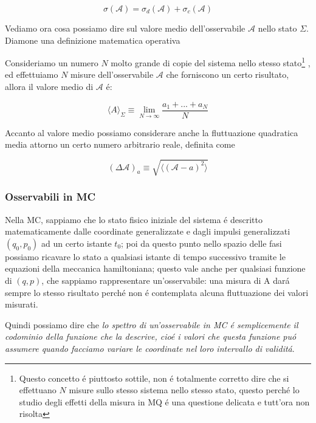 $$\sigma(\mathcal{A}) = \sigma_d(\mathcal{A}) + \sigma_{c}(\mathcal{A})$$

Vediamo ora cosa possiamo dire sul valore medio dell'osservabile $\mathcal{A}$ nello stato $\Sigma$. Diamone una definizione matematica operativa 

\begin{definizione}
	
Consideriamo un numero $N$ molto grande di copie del sistema nello stesso stato\footnote{Questo concetto \'e piuttosto sottile, non \'e totalmente corretto dire che si effettuano $N$ misure sullo stesso sistema nello stesso stato, questo perch\'e lo studio degli effetti della misura in MQ \'e una questione delicata e tutt'ora non risolta}
, ed effettuiamo $N$ misure dell'osservabile $\mathcal{A}$ che forniscono un certo risultato, allora il valore medio di $\mathcal{A}$ \'e:

$$\langle A\rangle_{\Sigma}\equiv\operatorname*{lim}_{N\rightarrow\infty}{\frac{a_{1}+...+a_{N}}{N}}$$

Accanto al valore medio possiamo considerare anche la fluttuazione quadratica media attorno un certo numero arbitrario reale, definita come

$$(\Delta\mathcal{A})_{a} \equiv \sqrt{\langle (\mathcal{A} - a)^2 \rangle}$$
\end{definizione}



\subsubsection{Osservabili in MC}

Nella MC, sappiamo che lo stato fisico iniziale del sistema \'e descritto matematicamente dalle coordinate generalizzate e dagli impulsi generalizzati $(q_0, p_0)$ ad un certo istante $t_0$; poi da questo punto nello spazio delle fasi possiamo ricavare lo stato a qualsiasi istante di tempo successivo tramite le equazioni della meccanica hamiltoniana; questo vale anche per qualsiasi funzione di $(q, p)$, che sappiamo rappresentare un'osservabile: una misura di A dar\'a sempre lo stesso risultato perch\'e non \'e contemplata alcuna fluttuazione dei valori misurati.

Quindi possiamo dire che \textit{lo spettro di un'osservabile in MC \'e semplicemente il codominio della funzione che la descrive, cio\'e i valori che questa funzione pu\'o assumere quando facciamo variare le coordinate nel loro intervallo di validit\'a}.



